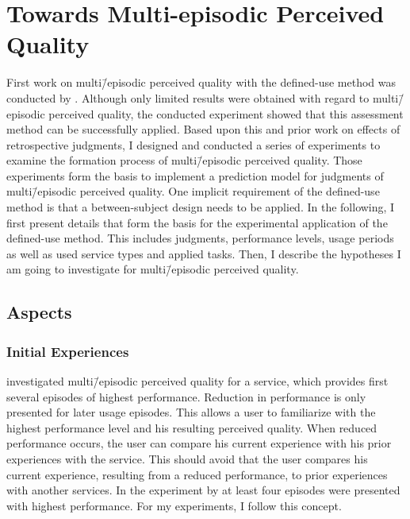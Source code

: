 \chapter{Towards Multi-episodic Perceived Quality}\label{chap:towards}
First work on multi\=/episodic perceived quality with the  defined-use method was conducted by \citet{moller_single-call_2011}.
Although only limited results were obtained with regard to multi\=/episodic perceived quality, the conducted experiment showed that this assessment method can be successfully applied.
Based upon this and prior work on effects of retrospective judgments, I designed and conducted a series of experiments to examine the formation process of multi\=/episodic perceived quality. 
Those experiments form the basis to implement a prediction model for judgments of multi\=/episodic perceived quality.
One implicit requirement of the defined-use method is that a between-subject design needs to be applied.
In the following, I first present details that form the basis for the experimental application of the defined-use method.
This includes judgments, performance levels, usage periods as well as used service types and applied tasks.
Then, I describe the hypotheses I am going to investigate for multi\=/episodic perceived quality.

\section{Aspects}

\subsection{Initial Experiences}
\citet{moller_single-call_2011} investigated multi\=/episodic perceived quality for a service, which provides first several episodes of highest performance.
Reduction in performance is only presented for later usage episodes.
This allows a user to familiarize with the highest performance level and his resulting perceived quality.
When reduced performance occurs, the user can compare his current experience with his prior experiences with the service.
This should avoid that the user compares his current experience, resulting from a reduced performance, to prior experiences with another services.
In the experiment by \citet{moller_single-call_2011} at least four episodes were presented with highest performance.
For my experiments, I follow this concept.

